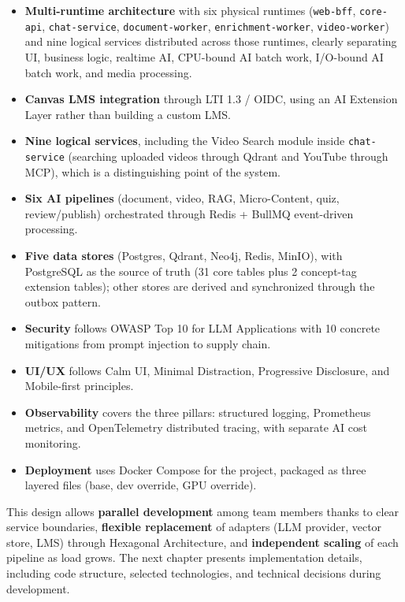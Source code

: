 \begin{itemize}
    \item \textbf{Multi-runtime architecture} with six physical runtimes
          (\texttt{web-bff}, \texttt{core-api}, \texttt{chat-service},
          \texttt{document-worker}, \texttt{enrichment-worker},
          \texttt{video-worker}) and nine logical services distributed
          across those runtimes, clearly separating UI, business logic,
          realtime AI, CPU-bound AI batch work, I/O-bound AI batch work,
          and media processing.
    \item \textbf{Canvas LMS integration} through LTI 1.3 / OIDC, using an
          AI Extension Layer rather than building a custom LMS.
    \item \textbf{Nine logical services}, including the Video Search module
          inside \texttt{chat-service} (searching uploaded videos through
          Qdrant and YouTube through MCP), which is a distinguishing point
          of the system.
    \item \textbf{Six AI pipelines} (document, video, RAG,
          Micro-Content, quiz, review/publish) orchestrated through
          Redis + BullMQ event-driven processing.
    \item \textbf{Five data stores} (Postgres, Qdrant, Neo4j, Redis,
          MinIO), with PostgreSQL as the source of truth (31 core tables
          plus 2 concept-tag extension tables);
          other stores are derived and synchronized through the outbox
          pattern.
    \item \textbf{Security} follows OWASP Top 10 for LLM Applications with
          10 concrete mitigations from prompt injection to supply chain.
    \item \textbf{UI/UX} follows Calm UI, Minimal Distraction,
          Progressive Disclosure, and Mobile-first principles.
    \item \textbf{Observability} covers the three pillars: structured
          logging, Prometheus metrics, and OpenTelemetry distributed
          tracing, with separate AI cost monitoring.
    \item \textbf{Deployment} uses Docker Compose for the project,
          packaged as three layered files (base, dev override, GPU override).
\end{itemize}

This design allows \textbf{parallel development} among team members thanks
to clear service boundaries, \textbf{flexible replacement} of adapters
(LLM provider, vector store, LMS) through Hexagonal Architecture, and
\textbf{independent scaling} of each pipeline as load grows. The next
chapter presents implementation details, including code structure,
selected technologies, and technical decisions during development.

